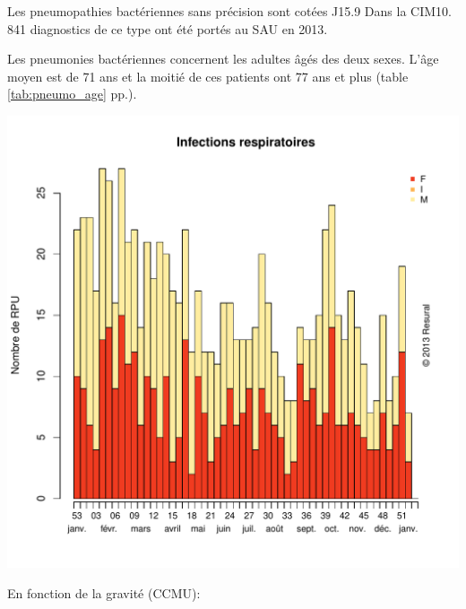 \documentclass[12pt,english,french,twoside]{book}\usepackage[]{graphicx}\usepackage[]{color}
\makeatletter
\def\maxwidth{ %
  \ifdim\Gin@nat@width>\linewidth
    \linewidth
  \else
    \Gin@nat@width
  \fi
}
\newenvironment{knitrout}{}{} %
\makeatother
\begin{document}
Les pneumopathies bactériennes sans précision sont cotées J15.9 Dans la CIM10.
841 diagnostics de ce type ont été portés au SAU en 2013.

Les pneumonies bactériennes concernent les adultes âgés des deux sexes. L'âge moyen est de 71 ans et la moitié de ces patients ont 77 ans et plus (table \ref{tab:pneumo_age} pp.\pageref{tab:pneumo_age}).

\begin{knitrout}
\color{fgcolor}
\includegraphics[width=\maxwidth]{figure/pneumo-1} 

\end{knitrout}

En fonction de la gravité (CCMU):
\end{document}
